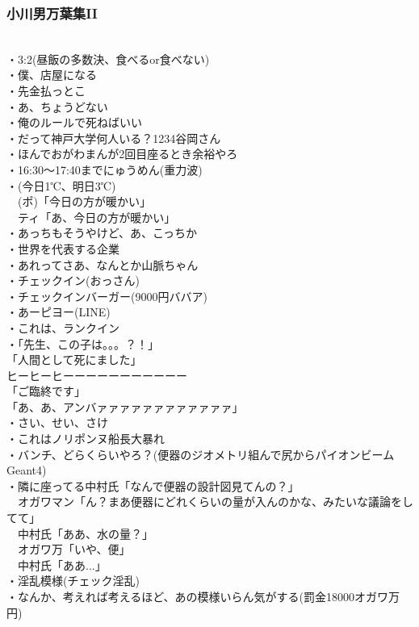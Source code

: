 \subsubsection{小川男万葉集II}
　\\
・3:2(昼飯の多数決、食べるor食べない)\\
・僕、店屋になる\\
・先金払っとこ\\
・あ、ちょうどない\\
・俺のルールで死ねばいい\\
・だって神戸大学何人いる？1234谷岡さん\\
・ほんでおがわまんが2回目座るとき余裕やろ\\
・16:30〜17:40までにゅうめん(重力波)\\
・(今日1℃、明日3℃)\\
　(ポ)「今日の方が暖かい」\\
　ティ「あ、今日の方が暖かい」\\
・あっちもそうやけど、あ、こっちか\\
・世界を代表する企業\\
・あれってさあ、なんとか山脈ちゃん\\
・チェックイン(おっさん)\\
・チェックインバーガー(9000円ババア)\\
・あーピヨー(LINE)\\
・これは、ランクイン\\
・「先生、この子は。。。？！」\\
 「人間として死にました」\\
 ヒーヒーヒーーーーーーーーーーー\\
 「ご臨終です」\\
 「あ、あ、アンバァァァァァァァァァァァァ」\\
・さい、せい、さけ\\
・これはノリポンヌ船長大暴れ\\
・バンチ、どらくらいやろ？(便器のジオメトリ組んで尻からパイオンビームGeant4)\\
・隣に座ってる中村氏「なんで便器の設計図見てんの？」\\
 　オガワマン「ん？まあ便器にどれくらいの量が入んのかな、みたいな議論をしてて」\\
 　中村氏「ああ、水の量？」\\
 　オガワ万「いや、便」\\
 　中村氏「ああ...」\\
・淫乱模様(チェック淫乱)\\
・なんか、考えれば考えるほど、あの模様いらん気がする(罰金18000オガワ万円)\\
